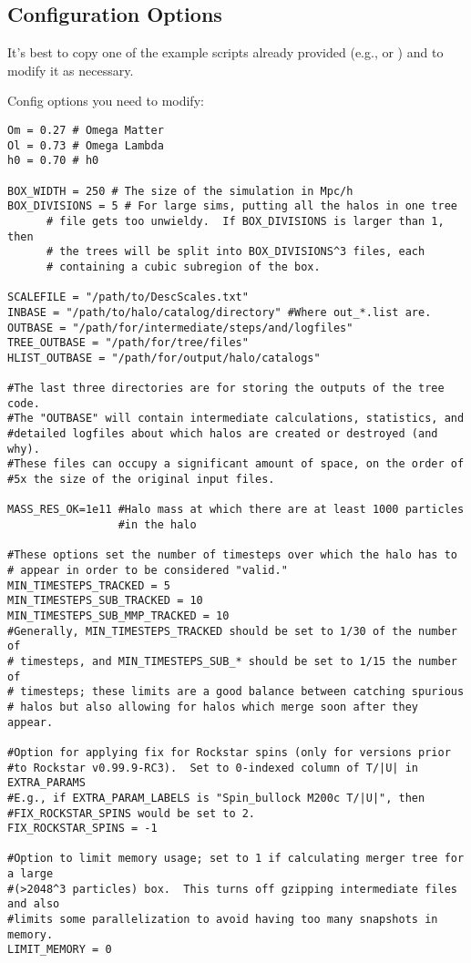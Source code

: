 \documentclass[12pt]{article}
\begin{document}
  \subsection{Configuration Options}
      It's best to copy one of the example scripts already provided 
      (e.g.,  or ) and to modify it as necessary.

      Config options you need to modify:
\begin{verbatim}
Om = 0.27 # Omega Matter
Ol = 0.73 # Omega Lambda
h0 = 0.70 # h0

BOX_WIDTH = 250 # The size of the simulation in Mpc/h
BOX_DIVISIONS = 5 # For large sims, putting all the halos in one tree
      # file gets too unwieldy.  If BOX_DIVISIONS is larger than 1, then
      # the trees will be split into BOX_DIVISIONS^3 files, each
      # containing a cubic subregion of the box.

SCALEFILE = "/path/to/DescScales.txt"
INBASE = "/path/to/halo/catalog/directory" #Where out_*.list are. 
OUTBASE = "/path/for/intermediate/steps/and/logfiles"
TREE_OUTBASE = "/path/for/tree/files"
HLIST_OUTBASE = "/path/for/output/halo/catalogs"

#The last three directories are for storing the outputs of the tree code.
#The "OUTBASE" will contain intermediate calculations, statistics, and
#detailed logfiles about which halos are created or destroyed (and why).
#These files can occupy a significant amount of space, on the order of
#5x the size of the original input files.

MASS_RES_OK=1e11 #Halo mass at which there are at least 1000 particles
                 #in the halo

#These options set the number of timesteps over which the halo has to
# appear in order to be considered "valid."    
MIN_TIMESTEPS_TRACKED = 5
MIN_TIMESTEPS_SUB_TRACKED = 10
MIN_TIMESTEPS_SUB_MMP_TRACKED = 10
#Generally, MIN_TIMESTEPS_TRACKED should be set to 1/30 of the number of
# timesteps, and MIN_TIMESTEPS_SUB_* should be set to 1/15 the number of
# timesteps; these limits are a good balance between catching spurious
# halos but also allowing for halos which merge soon after they appear.

#Option for applying fix for Rockstar spins (only for versions prior
#to Rockstar v0.99.9-RC3).  Set to 0-indexed column of T/|U| in EXTRA_PARAMS
#E.g., if EXTRA_PARAM_LABELS is "Spin_bullock M200c T/|U|", then
#FIX_ROCKSTAR_SPINS would be set to 2.
FIX_ROCKSTAR_SPINS = -1

#Option to limit memory usage; set to 1 if calculating merger tree for a large
#(>2048^3 particles) box.  This turns off gzipping intermediate files and also
#limits some parallelization to avoid having too many snapshots in memory.
LIMIT_MEMORY = 0
\end{verbatim}
\end{document}
